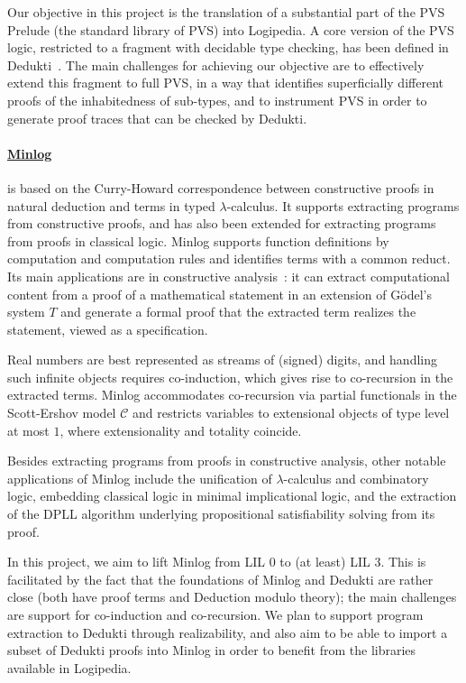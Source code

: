 Our objective in this project is the translation of a substantial part
of the PVS Prelude (the standard library of PVS) into Logipedia. A
core version of the PVS logic, restricted to a fragment with decidable
type checking, has been defined in
Dedukti~\cite{gilbert:extending}. The main challenges for achieving
our objective are to effectively extend this fragment to full PVS, in
a way that identifies superficially different proofs of the
inhabitedness of sub-types, and to instrument PVS in
order to generate proof traces that can be checked by Dedukti.

\paragraph*{\href{http://www.mathematik.uni-muenchen.de/~logik/minlog/index.php}{Minlog}}
is based on the Curry-Howard correspondence between constructive proofs
in natural deduction and terms in typed $\lambda$-calculus. It supports
extracting programs from constructive proofs, and has also been extended for extracting
programs from proofs in classical logic. Minlog supports function definitions by
computation and computation rules and identifies terms with a common reduct. Its
main applications are in constructive analysis~\cite{miyamoto:real}: it can extract
computational content from a proof of a mathematical statement in an extension
of G\"odel's system $T$ and generate a formal proof that the extracted term
realizes the statement, viewed as a specification.

Real numbers are best represented as streams of (signed) digits, and handling
such infinite objects requires co-induction, which gives rise to co-recursion in
the extracted terms. Minlog accommodates co-recursion via partial functionals in
the Scott-Ershov model $\mathcal{C}$ and restricts variables to extensional
objects of type level at most $1$, where extensionality and totality coincide.

Besides extracting programs from proofs in constructive analysis, other notable
applications of Minlog include the unification of $\lambda$-calculus and
combinatory logic, embedding classical logic in minimal implicational logic, and
the extraction of the DPLL algorithm underlying propositional satisfiability
solving from its proof.

In this project, we aim to lift Minlog from LIL $0$ to (at least) LIL
$3$.  This is facilitated by the fact that the foundations of Minlog
and Dedukti are rather close (both have proof terms and Deduction
modulo theory); the main challenges are support for co-induction and
co-recursion. We plan to support program extraction to Dedukti through
realizability, and also aim to be able to import a subset of Dedukti
proofs into Minlog in order to benefit from the libraries available in
Logipedia.

